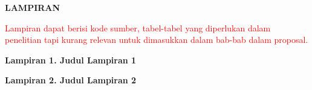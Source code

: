 \begin{spacing}{1.5}
\begin{center}
\textbf{\large LAMPIRAN}
\end{center}

\textcolor{red}{Lampiran dapat berisi kode sumber, tabel-tabel yang diperlukan dalam penelitian tapi kurang relevan \indent untuk dimasukkan dalam bab-bab dalam proposal.}

\bigskip

\textbf{Lampiran 1. Judul Lampiran 1}

\bigskip

\textbf{Lampiran 2. Judul Lampiran 2}

\end{spacing}